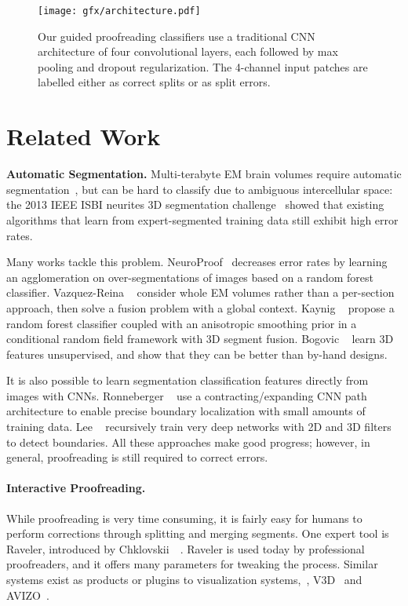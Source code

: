 \begin{figure*}[t]
\centering
\texttt{[image: gfx/architecture.pdf]}
\caption{Our guided proofreading classifiers use a traditional CNN architecture of four convolutional layers, each followed by max pooling and dropout regularization. The 4-channel input patches are labelled either as correct splits or as split errors.}
\label{fig:architecture}
\end{figure*}

\section{Related Work}

\textbf{Automatic Segmentation.} Multi-terabyte EM brain volumes require automatic segmentation~\cite{jain2010,Liu2014,NunezIglesias2013Machine,GALA2014}, but can be hard to classify due to ambiguous intercellular space: the 2013 IEEE ISBI neurites 3D segmentation challenge~\cite{isbi_challenge} showed that existing algorithms that learn from expert-segmented training data still exhibit high error rates.

Many works tackle this problem. NeuroProof~\cite{neuroproof2013} decreases error rates by learning an agglomeration on over-segmentations of images based on a random forest classifier. Vazquez-Reina \etal~\cite{amelio_segmentation} consider whole EM volumes rather than a per-section approach, then solve a fusion problem with a global context. Kaynig \etal~\cite{kaynig10} propose a random forest classifier coupled with an anisotropic smoothing prior in a conditional random field framework with 3D segment fusion. Bogovic \etal~\cite{BogovicHJ13} learn 3D features unsupervised, and show that they can be better than by-hand designs.

It is also possible to learn segmentation classification features directly from images with CNNs. Ronneberger \etal~\cite{RonnebergerFB15} use a contracting/expanding CNN path architecture to enable precise boundary localization with small amounts of training data. Lee \etal~\cite{lee2015recursive} recursively train very deep networks with 2D and 3D filters to detect boundaries.
%
All these approaches make good progress; however, in general, proofreading is still required to correct errors.

\paragraph{Interactive Proofreading.} While proofreading is very time consuming, it is fairly easy for humans to perform corrections through splitting and merging segments. One expert tool is Raveler, introduced by Chklovskii~\etal~\cite{chklovskii2010, raveler}. Raveler is used today by professional proofreaders, and it offers many parameters for tweaking the process. Similar systems exist as products or plugins to visualization systems,~\eg, V3D~\cite{proofreading_bottleneck} and AVIZO~\cite{markus_proofreading}.

